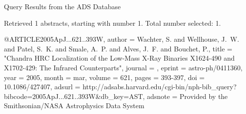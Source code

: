 Query Results from the ADS Database


Retrieved 1 abstracts, starting with number 1.  Total number selected: 1.

@ARTICLE{2005ApJ...621..393W,
   author = {{Wachter}, S. and {Wellhouse}, J.~W. and {Patel}, S.~K. and 
	{Smale}, A.~P. and {Alves}, J.~F. and {Bouchet}, P.},
    title = "{Chandra HRC Localization of the Low-Mass X-Ray Binaries X1624-490 and X1702-429: The Infrared Counterparts}",
  journal = {\apj},
   eprint = {astro-ph/0411360},
     year = 2005,
    month = mar,
   volume = 621,
    pages = {393-397},
      doi = {10.1086/427407},
   adsurl = {http://adsabs.harvard.edu/cgi-bin/nph-bib_query?bibcode=2005ApJ...621..393W&db_key=AST},
  adsnote = {Provided by the Smithsonian/NASA Astrophysics Data System}
}


